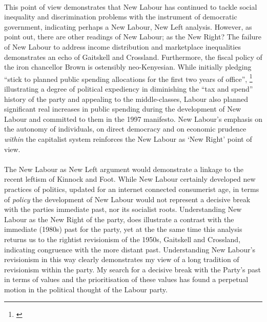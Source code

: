 \documentclass[13pt]{article}
\begin{document}
\begin{onehalfspace}
\paragraph{}This point of view demonstrates that New Labour has continued to tackle social inequality and discrimination problems with the instrument of democratic government, indicating perhaps a New Labour, New Left analysis. However, as  point out, there are other readings of New Labour; as the New Right? The failure of New Labour to address income distribution and marketplace inequalities demonstrates an echo of Gaitskell and Crossland. Furthermore, the fiscal policy of the iron chancellor Brown is ostensibly neo-Kenyesian. While initially pledging ``stick to planned public spending allocations for the first two years of office'', \footnote{\cite[Election Manifesto]{Labour:kx}} illustrating a degree of political expediency in diminishing the ``tax and spend'' history of the party and appealing to the middle-classes, Labour also planned significant real increases in public spending during the development of New Labour and committed to them in the 1997 manifesto. New Labour's emphasis on the autonomy of individuals, on direct democracy and on economic prudence \emph{within} the capitalist system reinforces the New Labour as `New Right' point of view.

\paragraph{}The New Labour as New Left argument would demonstrate a linkage to the recent leftism of Kinnock and Foot. While New Labour certainly developed new practices of politics, updated for an internet connected consumerist age, in terms of \emph{policy} the development of New Labour would not represent a decisive break with the parties immediate past, nor its socialist roots. Understanding New Labour as the New Right of the party, does illustrate a contrast with the immediate (1980s) past for the party, yet at the the same time this analysis returns us to the rightist revisionism of the 1950s, Gaitskell and Crossland, indicating congruence with the more distant past. Understanding New Labour's revisionism in this way clearly demonstrates my view of a long tradition of revisionism within the party. My search for a decisive break with the Party's past in terms of values and the prioritisation of these values has found a perpetual motion in the political thought of the Labour party.

\end{onehalfspace}
\newpage

\end{document}
